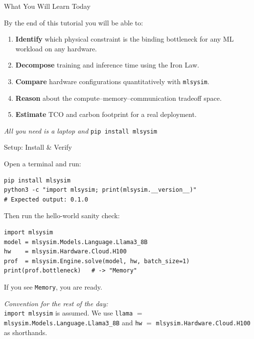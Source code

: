 \documentclass[aspectratio=169, 12pt]{beamer}
\newcommand{\mlsysim}{\texttt{mlsysim}}
\begin{document}
\begin{frame}{What You Will Learn Today}

\small
By the end of this tutorial you will be able to:
\begin{enumerate}
  \item \textbf{Identify} which physical constraint is the binding bottleneck
        for any ML workload on any hardware.
  \item \textbf{Decompose} training and inference time using the Iron Law.
  \item \textbf{Compare} hardware configurations quantitatively with \mlsysim.
  \item \textbf{Reason} about the compute--memory--communication tradeoff space.
  \item \textbf{Estimate} TCO and carbon footprint for a real deployment.
\end{enumerate}

\vspace{0.3cm}
\centering
\textit{All you need is a laptop and} \texttt{pip install mlsysim}
\end{frame}

\begin{frame}[fragile]{Setup: Install \& Verify}

\small
Open a terminal and run:

\begin{lstlisting}
pip install mlsysim
python3 -c "import mlsysim; print(mlsysim.__version__)"
# Expected output: 0.1.0
\end{lstlisting}

\vspace{0.3cm}
Then run the hello-world sanity check:

\begin{lstlisting}
import mlsysim
model = mlsysim.Models.Language.Llama3_8B
hw    = mlsysim.Hardware.Cloud.H100
prof  = mlsysim.Engine.solve(model, hw, batch_size=1)
print(prof.bottleneck)   # -> "Memory"
\end{lstlisting}

\vspace{0.2cm}
\centering
\alert{If you see \texttt{Memory}, you are ready.}

\vspace{0.3cm}
\footnotesize
\textit{Convention for the rest of the day:}\\
\texttt{import mlsysim} is assumed.
We use \texttt{llama} $=$ \texttt{mlsysim.Models.Language.Llama3\_8B}
and \texttt{hw} $=$ \texttt{mlsysim.Hardware.Cloud.H100} as shorthands.
\end{frame}
\end{document}
